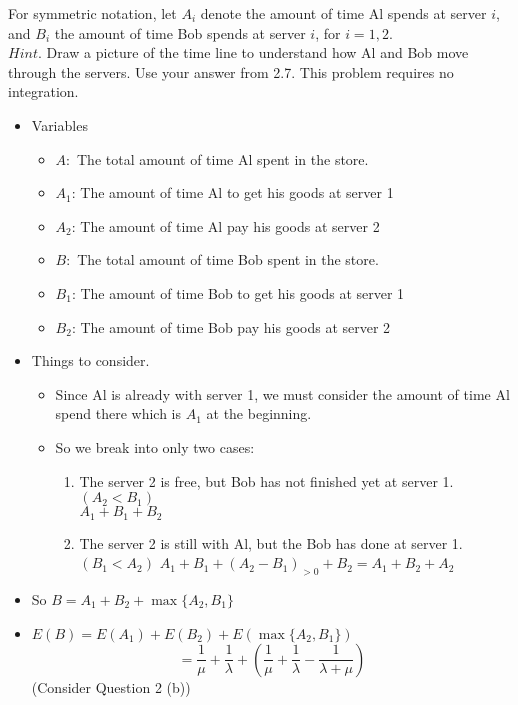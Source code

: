 \documentclass[12pt]{article}
\begin{document}
For symmetric notation, let $A_i$ denote the amount of time Al spends at server $i$, and $B_i$ the amount of time Bob spends at server $i$, for $i=1,2$.\\
$Hint$. Draw a picture of the time line to understand how Al and Bob move through the servers. Use your answer from 2.7. This problem requires no integration.
\begin{itemize}
    \item Variables
\begin{itemize}
    \item $A:$ The total amount of time Al spent in the store.
    \item $A_1$: The amount of time Al to get his goods at server 1 
    \item $A_2$: The amount of time Al pay his goods at server 2
    \item $B:$ The total amount of time Bob spent in the store.
    \item $B_1$: The amount of time Bob to get his goods at server 1
    \item $B_2$: The amount of time Bob pay his goods at server 2
\end{itemize}
    \item Things to consider.
    \begin{itemize}
        \item Since Al is already with server 1, we must consider the amount of time Al spend there which is $A_1$ at the beginning.
        \item So we break into only two cases:
        \begin{enumerate}[label=(\roman*)]
            \item The server 2 is free, but Bob has not finished yet at server 1. $(A_2<B_1)$\\
            $A_1+B_1+B_2$
            \item The server 2 is still with Al, but the Bob has done at server 1. $(B_1<A_2)$
            $A_1+B_1+(A_2-B_1)_{>0} +B_2             =A_1+B_2+A_2$
        \end{enumerate}
        
    \end{itemize}
    
    \item So $B=A_1+B_2+\max\{A_2,B_1\}$
    \item $E(B)=E(A_1)+E(B_2)+ E(\max\{A_2,B_1\}) $
    $$= \frac{1}{\mu}+\frac{1}{\lambda} +\left(\frac{1}{\mu}+\frac{1}{\lambda} -\frac{1}{\lambda+\mu} \right)$$  \hfill (Consider Question 2 (b))
\end{itemize}
\end{document}
